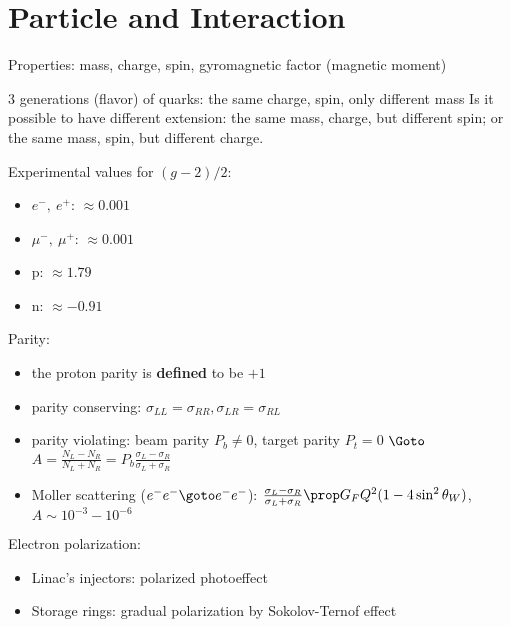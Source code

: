 \section{Particle and Interaction}
Properties: mass, charge, spin, gyromagnetic factor (magnetic moment)

3 generations (flavor) of quarks: the same charge, spin, only different mass
Is it possible to have different extension: the same mass, charge, but different spin; or the same mass, spin, but different charge.

Experimental values for $(g-2)/2$:
\begin{itemize}
    \item $e^-, \ e^+$: $\approx 0.001$
    \item $\mu^-, \ \mu^+$: $\approx 0.001$
    \item p: $\approx 1.79$
    \item n: $\approx -0.91$
\end{itemize}

Parity:
\begin{itemize}
    \item the proton parity is \textbf{defined} to be $+1$
    \item parity conserving: $\sigma_{LL} = \sigma_{RR}, \sigma_{LR} = \sigma_{RL}$
    \item parity violating: beam parity $P_b \ne 0$, target parity $P_t = 0$ $\Goto$ $A = \frac{N_L - N_R}{N_L + N_R} = P_b \frac{\sigma_L - \sigma_R}{\sigma_L + \sigma_R}$
    \item Moller scattering ($e^- e^- \goto e^- e^-$): $\frac{\sigma_L - \sigma_R}{\sigma_L + \sigma_R} \prop G_F Q^2 ( 1- 4\sin^2\theta_W)$, $A \sim 10^{-3} - 10^{-6}$
\end{itemize}

Electron polarization:
\begin{itemize}
    \item Linac's injectors: polarized photoeffect
    \item Storage rings: gradual polarization by Sokolov-Ternof effect
\end{itemize}
